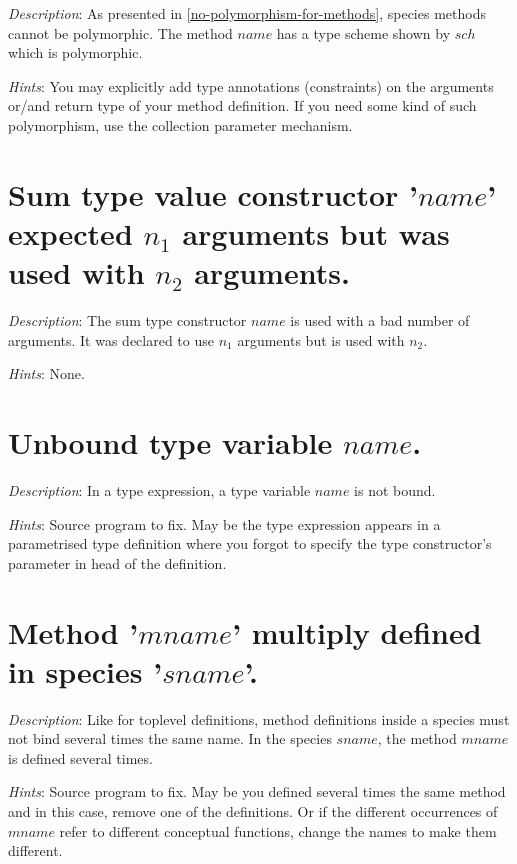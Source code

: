 {\em Description}: As presented in \ref{no-polymorphism-for-methods},
species methods cannot be polymorphic. The method $name$ has a
 type scheme shown by $sch$  which is polymorphic. 

{\em Hints}:  You may explicitly add type
annotations (constraints) on the arguments or/and return type of your
method definition. If you need some kind of such polymorphism, use the
collection parameter mechanism. 




\section*{Sum type  value constructor '$name$' expected $n_1$ arguments but
  was used with $n_2$ arguments.}

{\em Description}: The sum type constructor $name$ is used with a bad
number of arguments. It was declared to use $n_1$ arguments but is
used with $n_2$.

{\em Hints}: None.



\section*{Unbound type variable $name$.}

{\em Description}: In a type expression, a type variable $name$ is not
bound.

{\em Hints}: Source program to fix. May be the type expression appears
in a parametrised type definition where you forgot to specify the type
constructor's parameter in head of the definition.



\section*{Method '$mname$' multiply defined in species '$sname$'.}

{\em Description}: Like for toplevel definitions, method definitions
inside a species must not bind several times the same name. In the
species $sname$, the method $mname$ is defined several times.

{\em Hints}: Source program to fix. May be you defined several times
the same method and in this case, remove one of the definitions. Or if
the different occurrences of $mname$ refer to different conceptual
functions, change the names to make them different.



